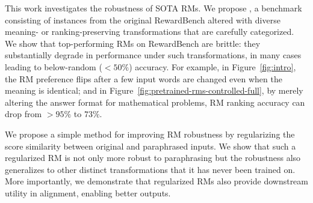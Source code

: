 This work investigates the robustness of SOTA RMs.
We propose \benchmark, a benchmark consisting of instances from the original RewardBench altered with diverse meaning- or ranking-preserving transformations that are carefully categorized.
We show that top-performing RMs on RewardBench are brittle: they substantially degrade in performance under such transformations, in many cases leading to below-random ($<50\%$) accuracy.
For example, in Figure~\ref{fig:intro}, the RM preference flips after a few input words are changed even when the meaning is identical; and in Figure~\ref{fig:pretrained-rms-controlled-full}, by merely altering the answer format for mathematical problems, RM ranking accuracy can drop from $>95\%$ to $73\%$.

We propose a simple method for improving RM robustness by regularizing the score similarity between original and paraphrased inputs.
We show that such a regularized RM is not only more robust to paraphrasing but the robustness also generalizes to other distinct transformations that it has never been trained on.
More importantly, we demonstrate that regularized RMs also provide downstream utility in alignment, enabling better outputs.
